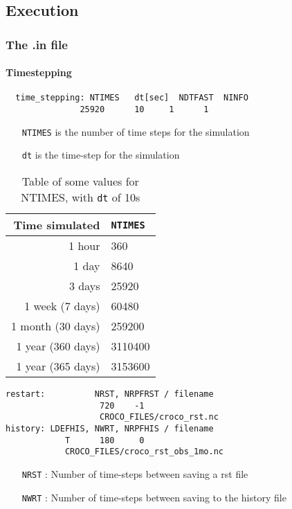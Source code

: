 \message{ !name(croco.tex)}\documentclass{article}
\begin{document}
\subsection{Execution}
\subsubsection{The .in file}
\paragraph{Timestepping}
\begin{lstlisting}
  time_stepping: NTIMES   dt[sec]  NDTFAST  NINFO
               25920      10     1      1
\end{lstlisting}
\begin{itemize}
  \item[\texttt{NTIMES}] is the number of time steps for the simulation
  \item[\texttt{dt}] is the time-step for the simulation 
\end{itemize}

\begin{table}[!h]
  \centering
  \begin{tabular}{rl} \hline
   Time simulated & \texttt{NTIMES} \\ \hline
    1 hour & 360 \\
    1 day & 8640 \\
    3 days & 25920 \\
    1 week (7 days)& 60480 \\
    1 month (30 days) & 259200 \\
    1 year (360 days) & 3110400 \\
    1 year (365 days) & 3153600 \\ \hline
  \end{tabular}
  \caption{Table of some values for NTIMES, with \texttt{dt} of 10s}
  \label{tab:NTIMESref}
\end{table}
\begin{lstlisting}
restart:          NRST, NRPFRST / filename
                   720    -1
                   CROCO_FILES/croco_rst.nc
history: LDEFHIS, NWRT, NRPFHIS / filename
            T      180     0
            CROCO_FILES/croco_rst_obs_1mo.nc
\end{lstlisting}
\begin{itemize}
\item[\texttt{NRST}]: Number of time-steps between saving a rst file
\item[\texttt{NWRT}]: Number of time-steps between saving to the history file 
\end{itemize}
\end{document}
